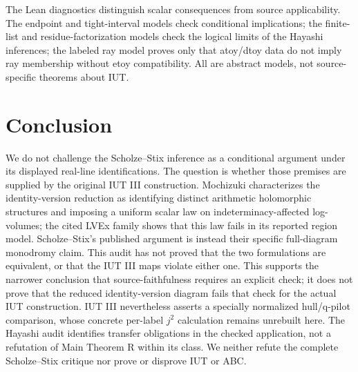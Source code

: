 \documentclass[11pt]{article}
\begin{document}
The Lean diagnostics distinguish scalar consequences from source applicability. The endpoint and tight-interval models check conditional implications; the finite-list and residue-factorization models check the logical limits of the Hayashi inferences; the labeled ray model proves only that atoy/dtoy data do not imply ray membership without etoy compatibility. All are abstract models, not source-specific theorems about IUT.

\section{Conclusion}
We do not challenge the Scholze--Stix inference as a conditional argument under its displayed real-line identifications. The question is whether those premises are supplied by the original IUT III construction. Mochizuki characterizes the identity-version reduction as identifying distinct arithmetic holomorphic structures and imposing a uniform scalar law on indeterminacy-affected log-volumes; the cited LVEx family shows that this law fails in its reported region model. Scholze--Stix's published argument is instead their specific full-diagram monodromy claim. This audit has not proved that the two formulations are equivalent, or that the IUT III maps violate either one. This supports the narrower conclusion that source-faithfulness requires an explicit check; it does not prove that the reduced identity-version diagram fails that check for the actual IUT construction. IUT III nevertheless asserts a specially normalized hull/q-pilot comparison, whose concrete per-label $j^2$ calculation remains unrebuilt here. The Hayashi audit identifies transfer obligations in the checked application, not a refutation of Main Theorem R within its class. We neither refute the complete Scholze--Stix critique nor prove or disprove IUT or ABC.
\end{document}
